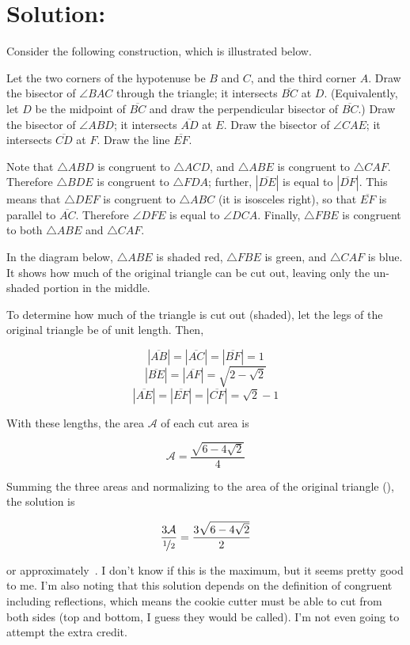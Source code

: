 \documentclass{article}
\begin{document}
\section*{Solution:}

Consider the following construction, which is illustrated below.

Let the two corners of the hypotenuse be $B$ and $C$, and the third corner $A$.
Draw the bisector of $\angle BAC$ through the triangle; it intersects $\overline{BC}$ at $D$.
(Equivalently, let $D$ be the midpoint of $\overline{BC}$ and draw the perpendicular bisector of $\overline{BC}$.)
Draw the bisector of $\angle ABD$; it intersects $\overline{AD}$ at $E$.
Draw the bisector of $\angle CAE$; it intersects $\overline{CD}$ at $F$.
Draw the line $\overline{EF}$.

Note that $\triangle ABD$ is congruent to $\triangle ACD$, and $\triangle ABE$ is congruent to $\triangle CAF$.
Therefore $\triangle BDE$ is congruent to $\triangle FDA$; further, $|\overline{DE}|$ is equal to $|\overline{DF}|$.
This means that $\triangle DEF$ is congruent to $\triangle ABC$ (it is isosceles right), so that $\overline{EF}$ is parallel to $\overline{AC}$.
Therefore $\angle DFE$ is equal to $\angle DCA$.
Finally, $\triangle FBE$ is congruent to both $\triangle ABE$ and $\triangle CAF$.

In the diagram below, $\triangle ABE$ is shaded red, $\triangle FBE$ is green, and $\triangle CAF$ is blue.
It shows how much of the original triangle can be cut out, leaving only the un-shaded portion in the middle.

To determine how much of the triangle is cut out (shaded), let the legs of the original triangle be of unit length. 
Then,

\[
|\overline{AB}|=|\overline{AC}|=|\overline{BF}|=1
\]
\[
|\overline{BE}|=|\overline{AF}|=\sqrt{2-\sqrt{2}}
\]
\[
|\overline{AE}|=|\overline{EF}|=|\overline{CF}|=\sqrt{2}-1
\]

With these lengths, the area $\mathcal{A}$ of each cut area is

\[
\mathcal{A}=\frac{\sqrt{6-4\sqrt{2}}}{4}
\]

Summing the three areas and normalizing to the area of the original triangle (), the solution is

\[
\frac{3\mathcal{A}}{\nicefrac{1}{2}}=\frac{3\sqrt{6-4\sqrt{2}}}{2}
\]

or approximately
\,.
I don't know if this is the maximum, but it seems pretty good to me.
I'm also noting that this solution depends on the definition of congruent including reflections, which means the cookie cutter must be able to cut from both sides (top and bottom, I guess they would be called).
I'm not even going to attempt the extra credit.
\end{document}
